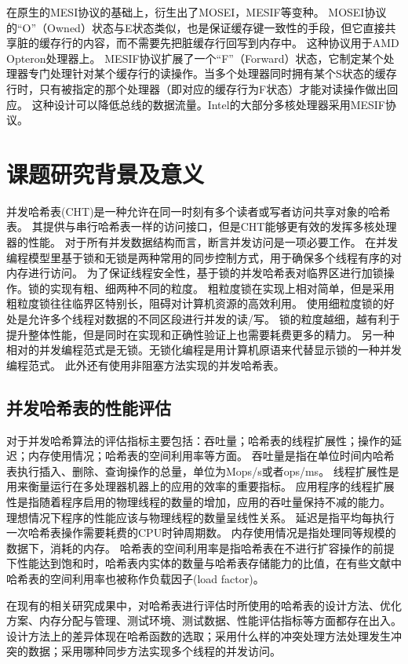 在原生的MESI协议的基础上，衍生出了MOSEI，MESIF等变种。
MOSEI协议的“O”（Owned）状态与E状态类似，也是保证缓存键一致性的手段，但它直接共享脏的缓存行的内容，而不需要先把脏缓存行回写到内存中。
这种协议用于AMD Opteron处理器上。
MESIF协议扩展了一个“F”（Forward）状态，它制定某个处理器专门处理针对某个缓存行的读操作。当多个处理器同时拥有某个S状态的缓存行时，只有被指定的那个处理器（即对应的缓存行为F状态）才能对读操作做出回应。
这种设计可以降低总线的数据流量。Intel的大部分多核处理器采用MESIF协议。 

\section{课题研究背景及意义}

并发哈希表(CHT)是一种允许在同一时刻有多个读者或写者访问共享对象的哈希表。
其提供与串行哈希表一样的访问接口，但是CHT能够更有效的发挥多核处理器的性能。
对于所有并发数据结构而言，断言并发访问是一项必要工作。
在并发编程模型里基于锁和无锁是两种常用的同步控制方式，用于确保多个线程有序的对内存进行访问。
为了保证线程安全性，基于锁的并发哈希表对临界区进行加锁操作。锁的实现有粗、细两种不同的粒度。
粗粒度锁在实现上相对简单，但是采用粗粒度锁往往临界区特别长，阻碍对计算机资源的高效利用。
使用细粒度锁的好处是允许多个线程对数据的不同区段进行并发的读/写。
锁的粒度越细，越有利于提升整体性能，但是同时在实现和正确性验证上也需要耗费更多的精力。
另一种相对的并发编程范式是无锁。无锁化编程是用计算机原语来代替显示锁的一种并发编程范式。
此外还有使用非阻塞方法实现的并发哈希表\cite{nonblocking,clht,shalev2006split}。

\subsection{并发哈希表的性能评估}
 
对于并发哈希算法的评估指标主要包括：吞吐量；哈希表的线程扩展性；操作的延迟；内存使用情况；哈希表的空间利用率等方面。
吞吐量是指在单位时间内哈希表执行插入、删除、查询操作的总量，单位为Mops/s或者ops/ms。
线程扩展性是用来衡量运行在多处理器机器上的应用的效率的重要指标。
应用程序的线程扩展性是指随着程序启用的物理线程的数量的增加，应用的吞吐量保持不减的能力。
理想情况下程序的性能应该与物理线程的数量呈线性关系。
延迟是指平均每执行一次哈希表操作需要耗费的CPU时钟周期数。
内存使用情况是指处理同等规模的数据下，消耗的内存。
哈希表的空间利用率是指哈希表在不进行扩容操作的前提下性能达到饱和时，哈希表内实体的数量与哈希表存储能力的比值，在有些文献中哈希表的空间利用率也被称作负载因子(load factor)。

在现有的相关研究成果中\cite{clht,cuckoo,hopscotch,metreveli2012cphash,nonblocking}，对哈希表进行评估时所使用的哈希表的设计方法、优化方案、内存分配与管理、测试环境、测试数据、性能评估指标等方面都存在出入。
设计方法上的差异体现在哈希函数的选取；采用什么样的冲突处理方法处理发生冲突的数据；采用哪种同步方法实现多个线程的并发访问。

